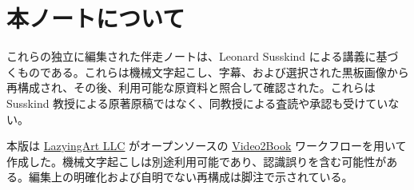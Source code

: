 \documentclass[11pt,oneside]{book}
\begin{document}
\frontmatter
\hypersetup{pageanchor=false}

\hypersetup{pageanchor=true}

\clearpage
\chapter*{本ノートについて}
これらの独立に編集された伴走ノートは、Leonard Susskind による講義に基づくものである。これらは機械文字起こし、字幕、および選択された黒板画像から再構成され、その後、利用可能な原資料と照合して確認された。これらは Susskind 教授による原著原稿ではなく、同教授による査読や承認も受けていない。

本版は \href{https://lazying.art}{LazyingArt LLC} がオープンソースの \href{https://github.com/lachlanchen/Video2Book}{Video2Book} ワークフローを用いて作成した。機械文字起こしは別途利用可能であり、認識誤りを含む可能性がある。編集上の明確化および自明でない再構成は脚注で示されている。
\clearpage
\tableofcontents
\mainmatter










\end{document}
